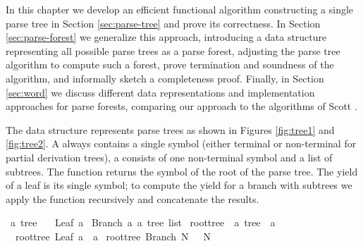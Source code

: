 \begin{isabellebody}
\begin{isamarkuptext}
In this chapter we develop an efficient functional algorithm constructing a single parse
tree in Section \ref{sec:parse-tree} and prove its correctness. In Section \ref{sec:parse-forest}
we generalize this approach, introducing a data structure representing all possible parse trees
as a parse forest, adjusting the parse tree algorithm to compute such a forest, prove termination
and soundness of the algorithm, and informally sketch a completeness proof. Finally, in Section \ref{sec:word}
we discuss different data representations and implementation approaches for parse forests, comparing our approach
to the algorithms of Scott \cite{Scott:2008}.%
\end{isamarkuptext}\isamarkuptrue%
%
\isadelimdocument
%
\endisadelimdocument
%
\isatagdocument
%
\isamarkuptrue%
%
\endisatagdocument
{\isafolddocument}%
%
\isadelimdocument
%
\endisadelimdocument
%
\begin{isamarkuptext}%
The data structure  represents parse trees as shown in Figures \ref{fig:tree1} and \ref{fig:tree2}.
A  always contains a single symbol (either terminal or non-terminal for partial derivation trees), a  consists of one non-terminal
symbol and a list of subtrees. The function  returns the symbol of the root of the
parse tree. The yield of a leaf is its single symbol; to compute the yield for a branch with
subtrees  we apply the function  recursively and concatenate the results.%
\end{isamarkuptext}\isamarkuptrue%
\isamarkupfalse%
\ {\isacharprime}{\kern0pt}a\ tree\ {\isacharequal}{\kern0pt}\isanewline
\ \ Leaf\ {\isacharprime}{\kern0pt}a\isanewline
{\isacharbar}{\kern0pt}\ Branch\ {\isacharprime}{\kern0pt}a\ {\isachardoublequoteopen}{\isacharprime}{\kern0pt}a\ tree\ list{\isachardoublequoteclose}\isanewline
\isanewline
{}\isamarkupfalse%
\ root{\isacharunderscore}{\kern0pt}tree\ {\isacharcolon}{\kern0pt}{\isacharcolon}{\kern0pt}\ {\isachardoublequoteopen}{\isacharprime}{\kern0pt}a\ tree\ {\isasymRightarrow}\ {\isacharprime}{\kern0pt}a{\isachardoublequoteclose}\ \isanewline
\ \ {\isachardoublequoteopen}root{\isacharunderscore}{\kern0pt}tree\ {\isacharparenleft}{\kern0pt}Leaf\ a{\isacharparenright}{\kern0pt}\ {\isacharequal}{\kern0pt}\ a{\isachardoublequoteclose}\isanewline
{\isacharbar}{\kern0pt}\ {\isachardoublequoteopen}root{\isacharunderscore}{\kern0pt}tree\ {\isacharparenleft}{\kern0pt}Branch\ N\ {\isacharunderscore}{\kern0pt}{\isacharparenright}{\kern0pt}\ {\isacharequal}{\kern0pt}\ N{\isachardoublequoteclose}\isanewline

\end{isabellebody}
